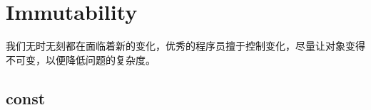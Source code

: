 \begin{savequote}[45mm]
\end{savequote}

\chapter{Immutability}
\label{ch:immutability}

\begin{content}
我们无时无刻都在面临着新的变化，优秀的程序员擅于控制变化，尽量让对象变得不可变，以便降低问题的复杂度。
\end{content}

\section{const}

